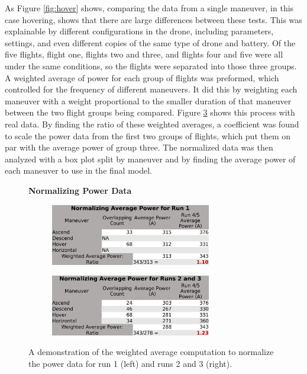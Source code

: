 \documentclass{article}
\begin{document}
As Figure \ref{fig:hover} shows, comparing the data from a single maneuver, in this case hovering, shows that there are large differences between these tests. This was explainable by different configurations in the drone, including parameters, settings, and even different copies of the same type of drone and battery. Of the five flights, flight one, flights two and three, and flights four and five were all under the same conditions, so the flights were separated into those three groups. A weighted average of power for each group of flights was preformed, which controlled for the frequency of different maneuvers. It did this by weighting each maneuver with a weight proportional to the smaller duration of that maneuver between the two flight groups being compared. Figure  \ref{fig:Norm} shows this process with real data. By finding the ratio of these weighted averages, a coefficient was found to scale the power data from the first two groups of flights, which put them on par with the average power of group three. The normalized data was then analyzed with a box plot split by maneuver and by finding the average power of each maneuver to use in the final model.\par

\begin{figure}
\centering
\large{\textbf{Normalizing Power Data}}\par
\begin{subfigure}[b]{0.5\textwidth}
  \centering
   \includegraphics[width=70mm]{images/Normalizing1.png}
  \label{fig:sub1}
\end{subfigure}%
\begin{subfigure}[b]{0.5\textwidth}
  \centering
  \includegraphics[width=70mm]{images/Normalizing2.png}
  \label{fig:sub2}
\end{subfigure}
\caption{A demonstration of the weighted average computation to normalize the power data for run 1 (left) and runs 2 and 3 (right).}
\label{fig:Norm}
\end{figure}
\end{document}
